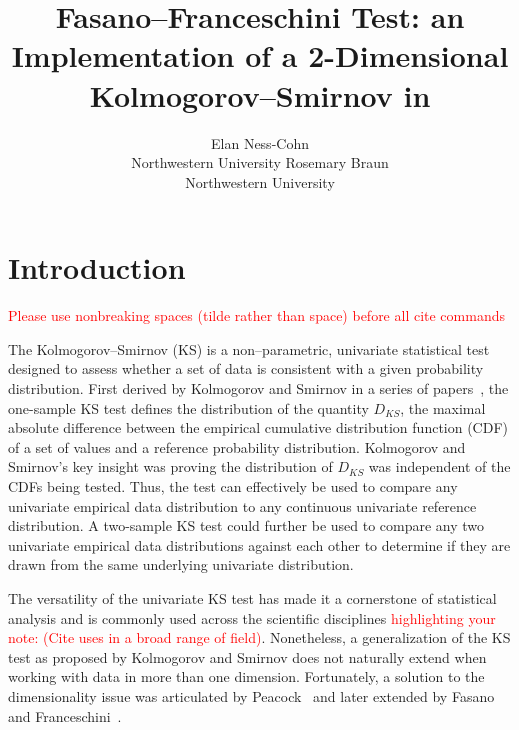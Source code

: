 \documentclass[codesnippet]{jss}
\author{Elan Ness-Cohn\\Northwestern University
   \And Rosemary Braun\\Northwestern University}
\title{Fasano--Franceschini Test: an Implementation of a 2-Dimensional Kolmogorov--Smirnov in \proglang{R}}
\newcommand{\RBnote}[1]{\textcolor{red}{#1}}
\begin{document}


\section[Introduction]{Introduction} \label{sec:intro}


\RBnote{Please use nonbreaking spaces (tilde rather than space) before all cite commands}

The Kolmogorov--Smirnov (KS) is a non--parametric, univariate statistical test designed to assess whether a set of data is consistent with a given probability distribution. First derived by Kolmogorov and Smirnov in a series of papers~\citep{Kolmogorov1933,Kolmogorov1933a,Smirnov1936,Smirnov1937,Smirnov1939,Smirnov1944,Smirnov1948}, the one-sample KS test defines the distribution of the quantity $D_{KS}$, the maximal absolute difference between the empirical cumulative distribution function (CDF) of a set of values and a reference probability distribution. Kolmogorov and Smirnov's key insight was proving the distribution of $D_{KS}$ was independent of the CDFs being tested. Thus, the test can effectively be used to compare any univariate empirical data distribution to any continuous univariate reference distribution. A two-sample KS test could further be used to compare any two univariate empirical data distributions against each other to determine if they are drawn from the same underlying univariate distribution.

The versatility of the univariate KS test has made it a cornerstone of statistical analysis and is commonly used across the scientific disciplines \RBnote{highlighting your note: (Cite uses in a broad range of field)}. Nonetheless, a generalization of the KS test as proposed by Kolmogorov and Smirnov does not naturally extend when working with data in more than one dimension. Fortunately, a solution to the dimensionality issue was articulated by Peacock~\citep{Peacock1983} and later extended by Fasano and Franceschini~\citep{Fasano1987}.
\end{document}
